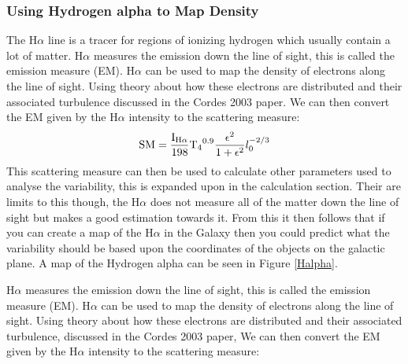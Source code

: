 \documentclass[10pt,a4paper]{article}
\begin{document}
\subsubsection{Using Hydrogen alpha to Map Density}
The H$\alpha$ line is a tracer for regions of ionizing hydrogen which usually contain a lot of matter. H$\alpha$ measures the emission down the line of sight, this is called the emission measure (EM). H$\alpha$ can be used to map the density of electrons along the line of sight. Using theory about how these electrons are distributed and their associated turbulence discussed in the Cordes 2003 paper. We can then convert the EM given by the H$\alpha$ intensity to  the scattering measure:
\[ \ce{SM}= \frac{\ce{I_{H\alpha}}}{198} \ce{T_4^{0.9}} \frac{\epsilon^2}{1+\epsilon^2}l_0^{-2/3} \]
This scattering measure can then be used to calculate other parameters used to analyse the variability, this is expanded upon in the calculation section. Their are limits to this though, the H$\alpha$ does not measure all of the matter down the line of sight but makes a good estimation towards it. From this it then follows that if you can create a map of the H$\alpha$ in the Galaxy then you could predict what the variability should be based upon the coordinates of the objects on the galactic plane. A map of the Hydrogen alpha can be seen in Figure \ref{Halpha}. 


H$\alpha$ measures the emission down the line of sight, this is called the emission measure (EM). H$\alpha$ can be used to map the density of electrons along the line of sight. Using theory about how these electrons are distributed and their associated turbulence, discussed in the Cordes 2003 paper, We can then convert the EM given by the H$\alpha$ intensity to the scattering measure:

\end{document}
